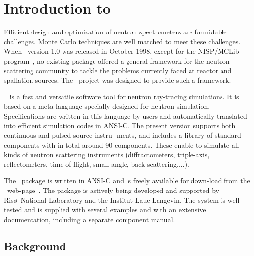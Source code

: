 
\chapter{Introduction to \MCS}

Efficient design and optimization of neutron spectrometers are
formidable challenges. Monte Carlo techniques are well matched to meet
these challenges. When \MCS\ version 1.0 was released in October
1998, except for the NISP/MCLib program~\cite{nisp_webpage}, no existing package offered a general framework for the neutron
scattering community to tackle the problems currently faced at reactor and
spallation sources. The \MCS\ project was designed to provide such a framework.

\MCS\ %
is a fast and versatile software tool for neutron ray-tracing simulations.
It is based on a meta-language specially designed for neutron
simulation. Specifications are written in this language by users and
automatically translated into efficient simulation codes in ANSI-C.
The present version supports both continuous and pulsed source instru-
ments, and includes a library of standard
components with in total around 90 components. These enable to simulate all kinds of neutron scattering instruments (diffractometers, triple-axis, reflectometers, time-of-flight, small-angle, back-scattering,...).

The \MCS\ package is written in ANSI-C and is freely available for down-load
from the \MCS\ web-page~\cite{mcstas_webpage}. The package is actively
being developed and supported by Ris\o\ National Laboratory and the Institut Laue Langevin. 
The system is well tested and
is supplied with several examples and with an extensive documentation,
including a separate component manual.


\section{Background}

